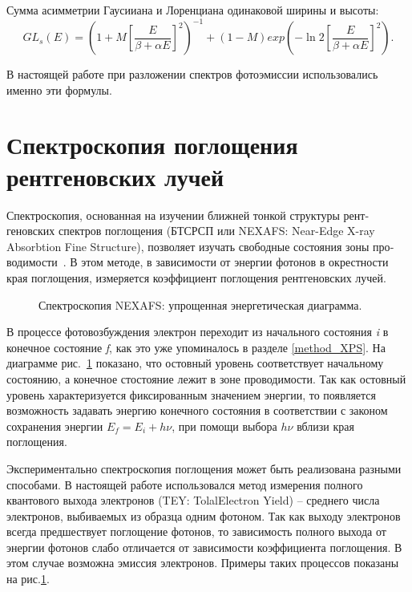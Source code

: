 Сумма асимметрии Гаусииана и Лоренциана одинаковой ширины и высоты:
	\begin{equation}
		GL_s(E)=\left(1+M\left[\frac{E}{\beta+\alpha E}\right]^2\right)^{-1}
		+(1-M)
		exp\left(-\ln{2\left[\frac{E}{\beta+\alpha E}\right]^2}\right).
	\end{equation}


В настоящей работе при разложении спектров фотоэмиссии использовались
именно эти формулы.



\section{Спектроскопия поглощения рентгеновских лучей}

Спектроскопия, основанная на изучении ближней тонкой структуры 
рент­геновских спектров поглощения (БТСРСП или NEXAFS: Near-Edge 
X-ray Absorbtion Fine Structure), позволяет изучать свободные 
состояния зоны про­водимости~\cite{Stohr1992}. В этом методе, в 
зависимости от энергии фотонов в окрестности края поглощения,
измеряется коэффициент поглощения рентгеновских лучей.
	\begin{figure}[!ht]
		\caption{Спектроскопия NEXAFS: упрощенная энергетическая диаграмма.}
		\label{pic:NEXAFS_diagram}
	\end{figure}
В процессе фотовозбуж­дения электрон переходит из начального состояния \textit{i} в конечное состояние \textit{f}, как это уже упоминалось в разделе \ref{method_XPS}.
На диаграмме рис.~\ref{pic:NEXAFS_diagram} показано, что остовный уровень
соответствует начальному состоянию, а конечное стостояние лежит в зоне 
проводимости. Так как остовный уровень характеризуется фиксированным значением энергии, то появляется возможность задавать энергию конечного состояния в соот­ветствии
с законом сохранения энергии $E_f=E_i+h\nu$, при помощи выбора $h\nu$
вблизи края поглощения. 

Экспериментально спектроскопия поглощения может быть реализована разными
способами. В настоящей работе использовался метод измерения полного квантового выхода 
электронов (TEY: TolalElectron Yield) – среднего числа электронов, выбиваемых из образца одним фо­тоном. Так как выходу электронов всегда предшествует
поглощение фотонов, то 
зависимость полного выхода от энергии фотонов слабо отличается от
зависимости коэффициента поглощения. В этом случае возможна эмиссия электронов. Примеры таких процессов
показаны на рис.\ref{pic:NEXAFS_diagram}.

